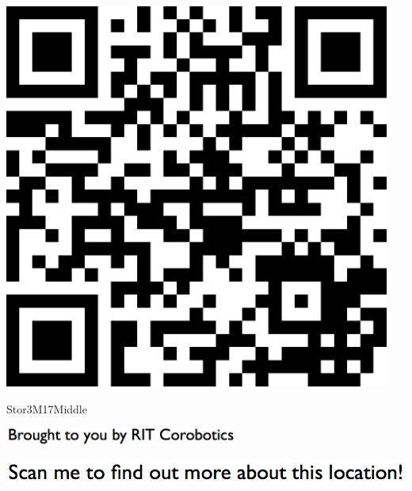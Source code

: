 \documentclass[letterpaper]{article}
\begin{document}
 \begingroup 
 \centerline{\includegraphics[scale=1,width=5in,height=5in]{Stor3M17Middle.png}} 
 \endgroup 
 \vspace*{\fill} 

 \hfill{\small Stor3M17Middle} 

  \vspace{0.7in} 
 
 \centerline{\includegraphics[scale=1,width=3in]{text-bottom.png}} 
 
 \pagebreak 
{} 
 \vspace*{\fill} 
 
  \centerline{\includegraphics[scale=1,width=6in]{text-top.png}} 
 
 \vspace{0.5in} 
 
\end{document}
